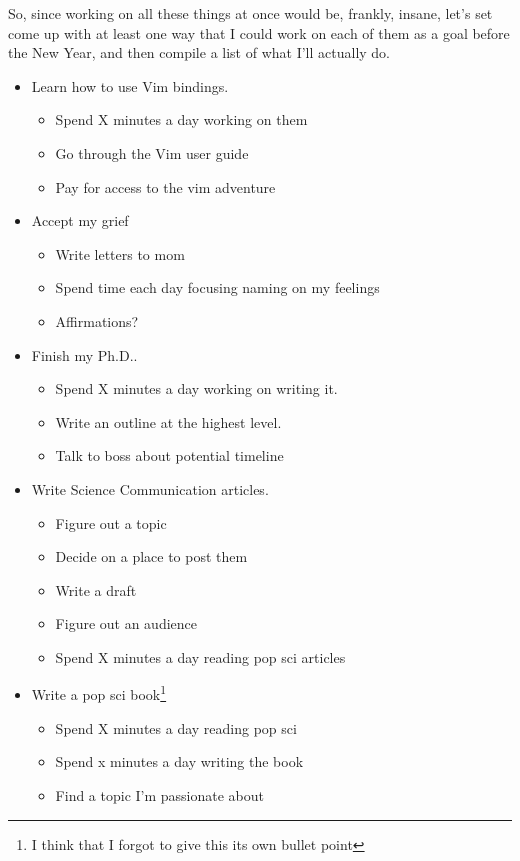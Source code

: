 \documentclass[12pt]{article}[titlepage]
\renewcommand{\,}{\textsuperscript{,}}
\begin{document}
So, since working on all these things at once would be, frankly, insane, let's set come up with at least one way that I could work on each of them as a goal before the New Year, and then compile a list of what I'll actually do.

\begin{itemize}  
\item Learn how to use Vim bindings.  
\begin{itemize}  
\item Spend X minutes a day working on them  
\item Go through the Vim user guide  
\item Pay for access to the vim adventure  
\end{itemize}  
\item Accept my grief  
\begin{itemize}  
\item Write letters to mom  
\item Spend time each day focusing naming on my feelings  
\item Affirmations?  
\end{itemize}  
\item Finish my Ph.D..  
\begin{itemize}  
\item Spend X minutes a day working on writing it.  
\item Write an outline at the highest level.  
\item Talk to boss about potential timeline  
\end{itemize}  
\item Write Science Communication articles.  
\begin{itemize}  
\item Figure out a topic  
\item Decide on a place to post them  
\item Write a draft  
\item Figure out an audience  
\item Spend X minutes a day reading pop sci articles  
\end{itemize}  
\item Write a pop sci book\footnote{I think that I forgot to give this its own bullet point}  
\begin{itemize}  
\item Spend X minutes a day reading pop sci  
\item Spend x minutes a day writing the book  
\item Find a topic I'm passionate about  

\end{itemize}
\end{itemize}
\end{document}
